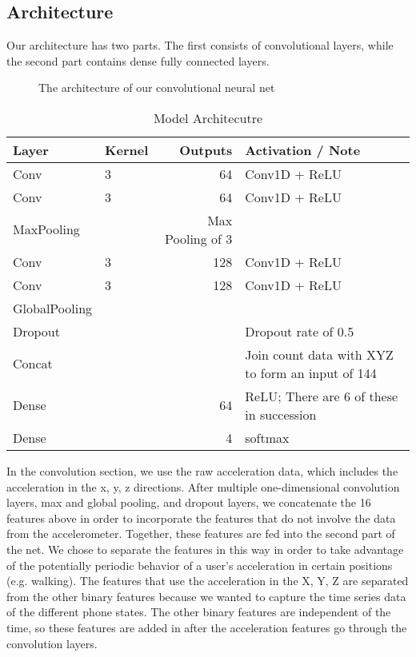 \subsection{Architecture}
Our architecture has two parts.
The first consists of convolutional layers, while the second part contains dense fully connected layers.


\begin{figure*}[!h]
  \vspace{-0.2cm}
  \centering
   {}
  \caption{The architecture of our convolutional neural net}
  \label{fig:ConvNet}
  \vspace{-0.1cm}
\end{figure*}


\begin{table}[!h]
\begin{center}
\begin{tabular}{llrp{2.5cm}}\toprule
Layer &  Kernel & Outputs  &  Activation / Note\\\midrule
Conv  & 3  & 64 &  Conv1D + ReLU \\
Conv  & 3  & 64 & Conv1D + ReLU  \\
MaxPooling   & & Max Pooling of 3\\
Conv & 3 & 128 &  Conv1D + ReLU\\
Conv & 3 & 128 & Conv1D + ReLU\\
GlobalPooling & & &\\
Dropout & & & Dropout rate of 0.5\\
Concat  &  & & Join count data with XYZ to form an input of 144\\
Dense & & 64 & ReLU; There are 6 of these in succession \\
Dense & & 4 & softmax

\end{tabular}
\caption{Model Architecutre}
\label{tab:ArchDescription}
\end{center}
\end{table}

In the convolution section, we use the raw acceleration data, which includes the acceleration in the x, y, z directions. 
After multiple one-dimensional convolution layers, max and global pooling, and dropout layers, 
we concatenate the 16 features above in order to incorporate the features that do not involve the data from the accelerometer.  
Together, these features are fed into the second part of the net.  
We chose to separate the features in this way in order to take advantage of the potentially periodic behavior of a user's acceleration in certain positions (e.g. walking).
The features that use the acceleration in the X, Y, Z are separated from the other binary features because we wanted to capture the time series data of the different phone states.
The other binary features are independent of the time, so these features are added in after the acceleration features go through the convolution layers.  

